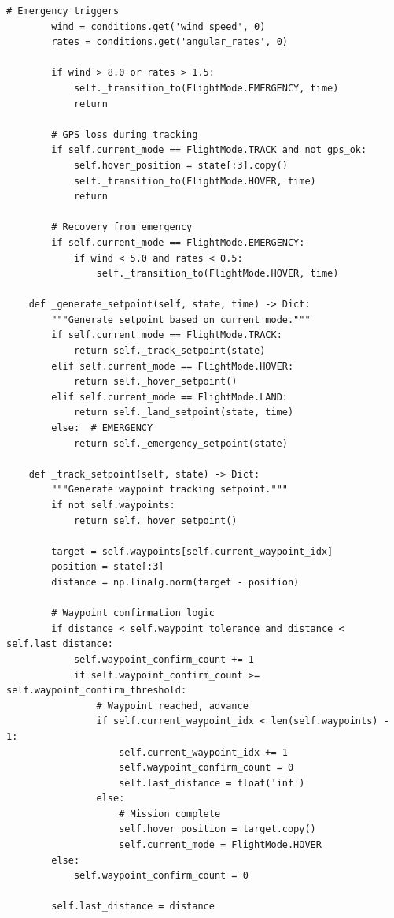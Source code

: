\begin{lstlisting}[caption={Flight mode supervisor (flight\_mode\_supervisor.py)}, label=lst:supervisor]
        # Emergency triggers
        wind = conditions.get('wind_speed', 0)
        rates = conditions.get('angular_rates', 0)

        if wind > 8.0 or rates > 1.5:
            self._transition_to(FlightMode.EMERGENCY, time)
            return

        # GPS loss during tracking
        if self.current_mode == FlightMode.TRACK and not gps_ok:
            self.hover_position = state[:3].copy()
            self._transition_to(FlightMode.HOVER, time)
            return

        # Recovery from emergency
        if self.current_mode == FlightMode.EMERGENCY:
            if wind < 5.0 and rates < 0.5:
                self._transition_to(FlightMode.HOVER, time)

    def _generate_setpoint(self, state, time) -> Dict:
        """Generate setpoint based on current mode."""
        if self.current_mode == FlightMode.TRACK:
            return self._track_setpoint(state)
        elif self.current_mode == FlightMode.HOVER:
            return self._hover_setpoint()
        elif self.current_mode == FlightMode.LAND:
            return self._land_setpoint(state, time)
        else:  # EMERGENCY
            return self._emergency_setpoint(state)

    def _track_setpoint(self, state) -> Dict:
        """Generate waypoint tracking setpoint."""
        if not self.waypoints:
            return self._hover_setpoint()

        target = self.waypoints[self.current_waypoint_idx]
        position = state[:3]
        distance = np.linalg.norm(target - position)

        # Waypoint confirmation logic
        if distance < self.waypoint_tolerance and distance < self.last_distance:
            self.waypoint_confirm_count += 1
            if self.waypoint_confirm_count >= self.waypoint_confirm_threshold:
                # Waypoint reached, advance
                if self.current_waypoint_idx < len(self.waypoints) - 1:
                    self.current_waypoint_idx += 1
                    self.waypoint_confirm_count = 0
                    self.last_distance = float('inf')
                else:
                    # Mission complete
                    self.hover_position = target.copy()
                    self.current_mode = FlightMode.HOVER
        else:
            self.waypoint_confirm_count = 0

        self.last_distance = distance


\end{lstlisting}
